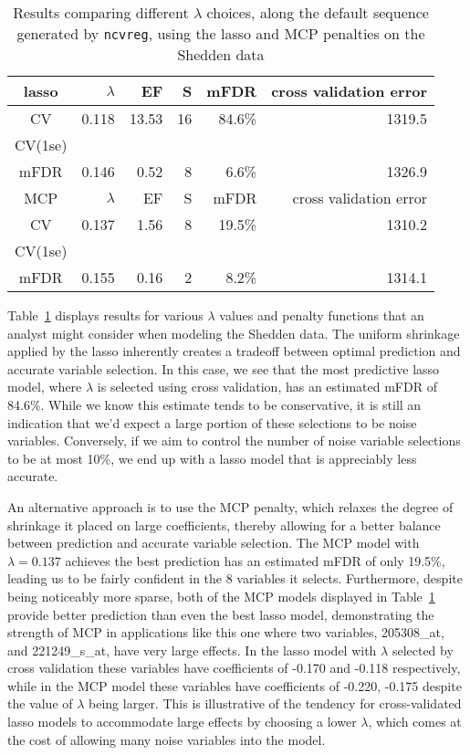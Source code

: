 \begin{table}[htb!]
\centering
\begin{tabular}{c | r r r r r }
  \hline
lasso & $\lambda$ & EF & S & mFDR & cross validation error \\ 
	\hline
	CV & 0.118 & 13.53 & 16 & 84.6\% &  1319.5 \\
	CV(1se) &   &   &   &    &  \\
	mFDR & 0.146 & 0.52 & 8 & 6.6\% & 1326.9 \\
\hline
MCP & $\lambda$ & EF & S & mFDR  & cross validation error \\
	\hline
	CV & 0.137 & 1.56 & 8 & 19.5\% &  1310.2 \\
	CV(1se) &  &  &  &  &   \\
	mFDR & 0.155 & 0.16 & 2 & 8.2\% &  1314.1 \\
		\hline
\end{tabular}
\caption{\label{Tab:shedden} Results comparing different $\lambda$ choices, along the default sequence generated by {\tt ncvreg}, using the lasso and MCP penalties on the Shedden data }
\end{table}

Table~\ref{Tab:shedden} displays results for various $\lambda$ values and penalty functions that an analyst might consider when modeling the Shedden data. The uniform shrinkage applied by the lasso inherently creates a tradeoff between optimal prediction and accurate variable selection. In this case, we see that the most predictive lasso model, where $\lambda$ is selected using cross validation, has an estimated mFDR of 84.6\%. While we know this estimate tends to be conservative, it is still an indication that we'd expect a large portion of these selections to be noise variables. Conversely, if we aim to control the number of noise variable selections to be at most 10\%, we end up with a lasso model that is appreciably less accurate. 

An alternative approach is to use the MCP penalty, which relaxes the degree of shrinkage it placed on large coefficients, thereby allowing for a better balance between prediction and accurate variable selection. The MCP model with $\lambda = 0.137$ achieves the best prediction has an estimated mFDR of only 19.5\%, leading us to be fairly confident in the 8 variables it selects. Furthermore, despite being noticeably more sparse, both of the MCP models displayed in Table~\ref{Tab:shedden} provide better prediction than even the best lasso model, demonstrating the strength of MCP in applications like this one where two variables, 205308\_at, and 221249\_s\_at, have very large effects. In the lasso model with $\lambda$ selected by cross validation these variables have coefficients of -0.170 and -0.118 respectively, while in the MCP model these variables have coefficients of -0.220, -0.175 despite the value of $\lambda$ being larger. This is illustrative of the tendency for cross-validated lasso models to accommodate large effects by choosing a lower $\lambda$, which comes at the cost of allowing many noise variables into the model.

